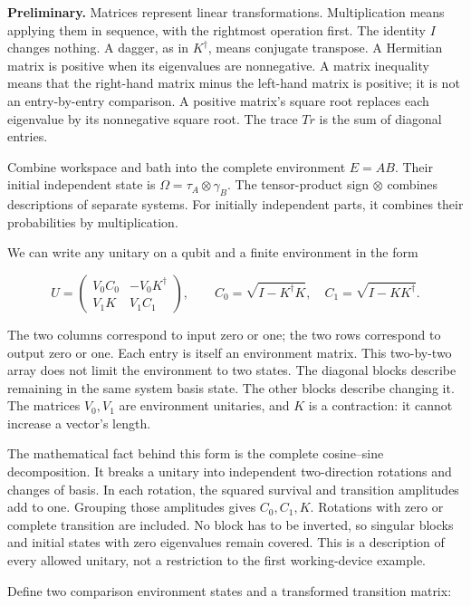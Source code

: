 \documentclass[11pt,letterpaper]{article}
\begin{document}
\textbf{Preliminary.} Matrices represent linear transformations. Multiplication means applying them in sequence, with the rightmost operation first. The identity \(I\) changes nothing. A dagger, as in \(K^{\dagger}\), means conjugate transpose. A Hermitian matrix is positive when its eigenvalues are nonnegative. A matrix inequality means that the right-hand matrix minus the left-hand matrix is positive; it is not an entry-by-entry comparison. A positive matrix's square root replaces each eigenvalue by its nonnegative square root. The trace \(Tr\) is the sum of diagonal entries.

Combine workspace and bath into the complete environment \(E = AB\). Their initial independent state is \(\Omega = \tau_{A} \otimes \gamma_{B}\). The tensor-product sign \(\otimes\) combines descriptions of separate systems. For initially independent parts, it combines their probabilities by multiplication.

\clearpage
We can write any unitary on a qubit and a finite environment in the form

\[U = \begin{pmatrix}
V_{0}C_{0} & - V_{0}K^{\dagger} \\
V_{1}K & V_{1}C_{1}
\end{pmatrix},\quad\quad C_{0} = \sqrt{I - K^{\dagger}K},\quad C_{1} = \sqrt{I - KK^{\dagger}}.\]

The two columns correspond to input zero or one; the two rows correspond to output zero or one. Each entry is itself an environment matrix. This two-by-two array does not limit the environment to two states. The diagonal blocks describe remaining in the same system basis state. The other blocks describe changing it. The matrices \(V_{0},V_{1}\) are environment unitaries, and \(K\) is a contraction: it cannot increase a vector's length.

The mathematical fact behind this form is the complete cosine--sine decomposition. It breaks a unitary into independent two-direction rotations and changes of basis. In each rotation, the squared survival and transition amplitudes add to one. Grouping those amplitudes gives \(C_{0},C_{1},K\). Rotations with zero or complete transition are included. No block has to be inverted, so singular blocks and initial states with zero eigenvalues remain covered. This is a description of every allowed unitary, not a restriction to the first working-device example.

Define two comparison environment states and a transformed transition matrix:
\end{document}
